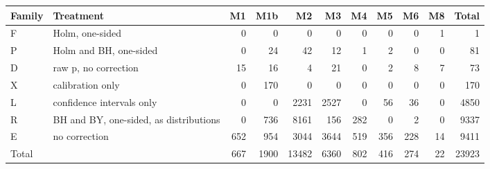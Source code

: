 \begin{adjustbox}{max width=\linewidth}
\begin{tabular}{llrrrrrrrrr}
\toprule
Family & Treatment & M1 & M1b & M2 & M3 & M4 & M5 & M6 & M8 & Total \\
\midrule
F & Holm, one-sided & 0 & 0 & 0 & 0 & 0 & 0 & 0 & 1 & 1 \\
P & Holm and BH, one-sided & 0 & 24 & 42 & 12 & 1 & 2 & 0 & 0 & 81 \\
D & raw p, no correction & 15 & 16 & 4 & 21 & 0 & 2 & 8 & 7 & 73 \\
X & calibration only & 0 & 170 & 0 & 0 & 0 & 0 & 0 & 0 & 170 \\
L & confidence intervals only & 0 & 0 & 2231 & 2527 & 0 & 56 & 36 & 0 & 4850 \\
R & BH and BY, one-sided, as distributions & 0 & 736 & 8161 & 156 & 282 & 0 & 2 & 0 & 9337 \\
E & no correction & 652 & 954 & 3044 & 3644 & 519 & 356 & 228 & 14 & 9411 \\
Total &  & 667 & 1900 & 13482 & 6360 & 802 & 416 & 274 & 22 & 23923 \\
\bottomrule
\end{tabular}
\end{adjustbox}
\par{}
